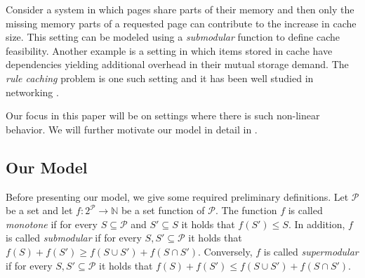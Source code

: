 \documentclass[11pt]{article}
\newcommand{\cP}{{\mathcal{P}}}
\begin{document}
Consider a system in which pages share parts of their memory and then only the missing memory parts of a requested page can contribute to the increase in cache size. This setting can be modeled using a {\em submodular} function to define cache feasibility.
Another example is a setting in which items stored in cache have dependencies yielding additional overhead in their mutual storage demand. The {\em rule caching} problem is one such setting and it has been well studied in networking \cite{dong2015rule,yan2014cab,sheu2016wildcard,huang2015cost, li2019tale,stonebraker1990rules,li2015fdrc,gao2021ovs,cheng2018switch,rottenstreich2016optimal,li2020taming,gamage2012high,yan2018adaptive,rottenstreich2020cooperative,rastegar2020rule,yang2020pipecache,doron2024approximations}. %
 
 Our focus in this paper will be on settings where there is such non-linear behavior.
 We will further motivate our model in detail in .  

\subsection{Our Model}


Before presenting our model, we give some required preliminary definitions. %
Let $\cP$ be a set and let $f:2^{\cP} \rightarrow \mathbb{N}$ be a set function of $\cP$. The function $f$ is called {\em monotone} if for every $S \subseteq \cP$ and $S'\subseteq S$ it holds that $f(S') \leq S$. In addition, $f$ is called {\em submodular} if for every $S,S' \subseteq \cP$ it holds that $f(S)+f(S') \geq f\left(S \cup S'\right)+f\left(S \cap S'\right)$. Conversely, $f$ is called {\em supermodular} if for every $S,S' \subseteq \cP$ it holds that $f(S)+f(S') \leq f\left(S \cup S'\right)+f\left(S \cap S'\right)$.
\end{document}
